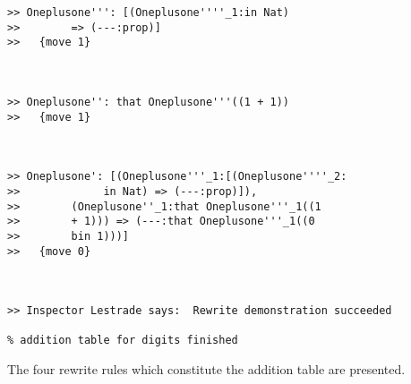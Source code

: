 \documentclass{article}
\begin{document}
\begin{verbatim}
>> Oneplusone''': [(Oneplusone''''_1:in Nat) 
>>        => (---:prop)]
>>   {move 1}



>> Oneplusone'': that Oneplusone'''((1 + 1)) 
>>   {move 1}



>> Oneplusone': [(Oneplusone'''_1:[(Oneplusone''''_2:
>>             in Nat) => (---:prop)]),
>>        (Oneplusone''_1:that Oneplusone'''_1((1 
>>        + 1))) => (---:that Oneplusone'''_1((0 
>>        bin 1)))]
>>   {move 0}



>> Inspector Lestrade says:  Rewrite demonstration succeeded

% addition table for digits finished

\end{verbatim}

The four rewrite rules which constitute the addition table are presented.
\end{document}
